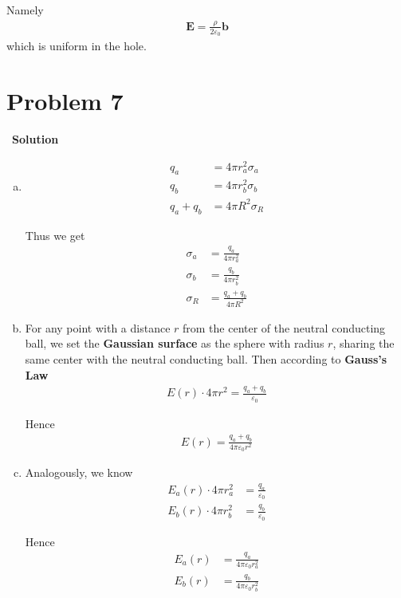 \documentclass[12pt,a4paper]{article}
\begin{document}
Namely
\begin{align}
    \textbf{E} = \frac{\rho}{2\varepsilon_0} \textbf{b}
\end{align}
which is uniform in the hole.

\section*{\large \textbf{Problem 7}}~{\textbf{Solution}}

\begin{enumerate}[(a)]
    \item
    \begin{align}
        q_a &= 4\pi r_a ^2 \sigma_a \\
        q_b &= 4\pi r_b ^2 \sigma_b \\
        q_a + q_b &= 4\pi R^2 \sigma_R
    \end{align}
    
    Thus we get
    \begin{align}
        \sigma_a &= \frac{q_a}{4\pi r_a ^2} \\
        \sigma_b &= \frac{q_b}{4\pi r_b ^2} \\
        \sigma_R &= \frac{q_a + q_b}{4\pi R^2}
    \end{align}
    
    \item For any point with a distance $r$ from the center of the neutral conducting ball, we set the \textbf{Gaussian surface} as the sphere with radius $r$, sharing the same center with the neutral conducting ball. Then according to \textbf{Gauss's Law}
    \begin{align}
        E(r) \cdot 4\pi r^2 = \frac{q_a + q_b}{\varepsilon_0}
    \end{align}
    
    Hence
    \begin{align}
        E(r) = \frac{q_a + q_b}{4\pi \varepsilon_0 r^2}
    \end{align}
    
    \item Analogously, we know
    \begin{align}
        E_a(r) \cdot 4\pi r_a ^2 &= \frac{q_a}{\varepsilon_0} \\
        E_b(r) \cdot 4\pi r_b ^2 &= \frac{q_b}{\varepsilon_0}
    \end{align}
    
    Hence
    \begin{align}
        E_a(r) &= \frac{q_a}{4\pi \varepsilon_0 r_a ^2} \\
        E_b(r) &= \frac{q_b}{4\pi \varepsilon_0 r_b ^2}
    \end{align}
    

\end{enumerate}
\end{document}
